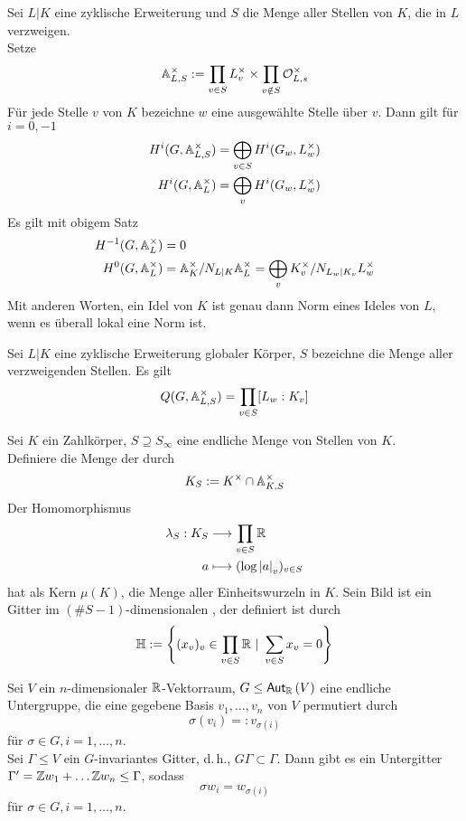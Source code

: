 \Satz{}
Sei $L|K$ eine zyklische Erweiterung und $S$ die Menge aller Stellen von $K$, die in $L$ verzweigen.\\
Setze
\[ \mathbb{A}_{L,S}^\times := \prod_{v\in S}L_v^\times \times \prod_{v\notin S} \mathcal{O}_{L,s}^\times \]
Für jede Stelle $v$ von $K$ bezeichne $w$ eine ausgewählte Stelle über $v$. Dann gilt für $i = 0,-1$
\begin{align*}
H^i(G, \mathbb{A}_{L,S}^\times ) &= \bigoplus_{v\in S}H^i(G_w, L_w^\times)\\
H^i(G, \mathbb{A}_{L}^\times ) &= \bigoplus_{v}H^i(G_w, L_w^\times)\\
\end{align*}
\Bem{}
Es gilt mit obigem Satz
\begin{align*}
H^{-1} (G, \mathbb{A}_L^\times) &= 0\\
H^0(G,\mathbb{A}_L^\times) &= \mathbb{A}_K^\times/N_{L|K}\mathbb{A}_L^\times = \bigoplus_{v} K_v^\times / N_{L_w|K_v}L_w^\times
\end{align*}
Mit anderen Worten, ein Idel von $K$ ist genau dann Norm eines Ideles von $L$, wenn es überall lokal eine Norm ist.

\Satz{}
Sei $L|K$ eine zyklische Erweiterung globaler Körper, $S$ bezeichne die Menge aller verzweigenden Stellen. Es gilt
\[ Q(G, \mathbb{A}_{L,S}^\times) = \prod_{v\in S} [L_w:K_v] \]

\Satz{}
Sei $K$ ein Zahlkörper, $S \supseteq S_\infty$ eine endliche Menge von Stellen von $K$.\\
Definiere die Menge der  durch
\[ K_S := K^\times \cap \mathbb{A}_{K,S}^\times \]
Der Homomorphismus
\begin{align*}
\lambda_S : K_S &\overset{}{\longrightarrow} \prod_{v\in S} \mathbb{R}\\
a & \longmapsto (\log \left|a\right|_v)_{v\in S} 
\end{align*}
hat als Kern $\mu(K)$, die Menge aller Einheitswurzeln in $K$. Sein Bild ist ein Gitter im $(\#S-1)$-dimensionalen , der definiert ist durch
\[ \H:= \set{(x_v)_v \in \prod_{v\in S}\R }{\sum_{v\in S}x_v = 0} \]

\Lem{}
Sei $V$ ein $n$-dimensionaler $\mathbb{R}$-Vektorraum, $G \leq \textsf{Aut}_{\mathbb{R}}\left(V\right)$ eine endliche Untergruppe, die eine gegebene Basis $v_1,\ldots,v_n$ von $V$ permutiert durch
\[ \sigma(v_i) =: v_{\sigma(i)} \]
für $\sigma \in G, i = 1,\ldots,n$.\\
Sei $\Gamma \leq V$ ein $G$-invariantes Gitter, d.\,h., $G\Gamma \subset \Gamma$. Dann gibt es ein Untergitter $\Gamma' = \mathbb{Z} w_1 + \ldots \mathbb{Z} w_n \leq \Gamma$, sodass
\[ \sigma w_i = w_{\sigma(i)} \]
für $\sigma \in G, i = 1,\ldots,n$.

